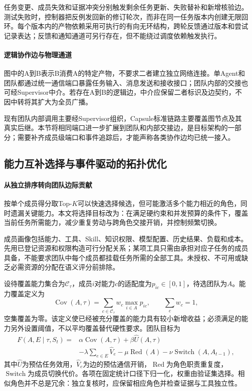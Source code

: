 任务变更、成员失效和证据冲突分别触发剩余任务更新、失败替补和新增核验边。测试失败时，控制器把反例发回新的修订轮次，而非在同一任务版本内创建无限回环。每个版本内的产物依赖采用可执行的有向无环结构，跨轮反馈通过版本和尝试记录表达；反馈和通知通道可另行存在，但不能绕过调度依赖触发执行。

\paragraph{逻辑协作边与物理通道}
图中的A到B表示B消费A的特定产物，不要求二者建立独立网络连接。单Agent和团队都通过统一通信端口暴露任务输入、消息发送和接收接口；团队内部的交接也可经Supervisor中介。若存在A到B的逻辑边，中介应保留二者标识及边契约，不因中转将其扩大为全员广播。

现有团队内部调用主要经Supervisor组织，Capsule标准链路主要覆盖图节点及其真实后继。本节将相同端口进一步扩展到团队和内部交接边，是目标架构的一部分；需要补齐成员级端口和事件追踪后，才能声称各类协作边均已统一接入。

\subsection{能力互补选择与事件驱动的拓扑优化}

\paragraph{从独立排序转向团队边际贡献}
按单个成员得分取Top-$K$可以快速选择候选，但可能激活多个能力相近的角色，同时遗漏关键能力。本文将选择目标改为：在满足硬约束和并发预算的条件下，覆盖当前任务所需能力，减少重复劳动与跨角色交接开销，并控制频繁切换。

成员画像包括能力、工具、Skill、知识权限、模型配置、历史结果、负载和成本。先用已登记资源和权限构造可行分配关系；某项工具只需由承担对应子任务的成员具备，不能要求团队中每个成员都挂载任务所需的全部工具。未授权、不可用或缺乏必需资源的分配在语义评分前排除。

设待覆盖能力集合为$\mathcal{C}_{\tau}$，成员$i$对能力$c$的适配度为$p_{ic}\in[0,1]$，待选团队为$A$。能力覆盖定义为
\begin{equation}
\operatorname{Cov}(A,\tau)=
\sum_{c\in\mathcal{C}_{\tau}}w_c\max_{i\in A}p_{ic},
\qquad \sum_c w_c=1,
\end{equation}
空集覆盖为零。该定义使已经被充分覆盖的能力具有较小新增收益；必须满足的能力另外设置阈值，不以平均覆盖替代硬性要求。团队目标为
\begin{equation}
\begin{aligned}
F(A,E\mid\tau,S_t)={}&\alpha\operatorname{Cov}(A,\tau)
+\beta\widehat{U}(A,\tau)\\
&-\lambda\sum_{e\in E}\widehat{V}_e
-\mu\operatorname{Red}(A)
-\nu\operatorname{Switch}(A,A_{t-1}),
\end{aligned}
\label{eq:mesh_team_objective}
\end{equation}
其中$\widehat{U}$为预估任务效用，$\widehat{V}_e$为边的预估通信开销，$\operatorname{Red}$为角色职责重复度，$\operatorname{Switch}$为成员切换代价。各项在固定统计口径下归一化，权重由验证集选择。相似角色并不总是冗余：独立复核时，应保留相应角色并检查证据与工具独立性。

